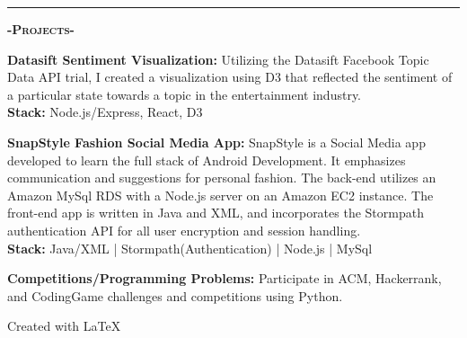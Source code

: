 \documentclass[12pt]{article}
\begin{document}
\noindent\rule{19cm}{0.4pt}

\begin{center}
\textbf{\textsc{-Projects-}}\\
\end{center}
\begin{footnotesize}

\flushleft

\color{Cerulean}\textbf{Datasift Sentiment Visualization:} 
\color{Black}Utilizing the Datasift Facebook Topic Data API trial, I created a visualization using D3 that reflected the sentiment of a particular state towards a topic in the entertainment industry.\\
\smallskip
\setlength\parindent{24pt}\textbf{Stack:} \color{TealBlue} Node.js/Express, React, D3
\bigskip

\flushleft
\color{Cerulean}\textbf{SnapStyle Fashion Social Media App:} 
\color{Black}SnapStyle is a Social Media app developed to learn the full stack of Android Development. It emphasizes communication and suggestions for personal fashion. The back-end utilizes an \color{TealBlue}Amazon MySql RDS \color{Black}with a \color{TealBlue}Node.js \color{Black} server on an \color{TealBlue}Amazon EC2 \color{Black}instance. The front-end app is written in \color{TealBlue}Java and XML, \color{Black} and incorporates the \color{TealBlue}Stormpath \color{Black}authentication API for all user encryption and session handling.\\
\smallskip
\setlength\parindent{24pt}\textbf{Stack:} \color{TealBlue} Java/XML | Stormpath(Authentication) | Node.js | MySql
\bigskip

\setlength\parindent{0pt}
\color{Cerulean}\textbf{Competitions/Programming Problems:}
\color{Black}Participate in ACM, Hackerrank, and CodingGame challenges and competitions using \color{TealBlue}Python.\color{Black}

\smallskip

\end{footnotesize}

\center
Created with \LaTeX
\end{document}

